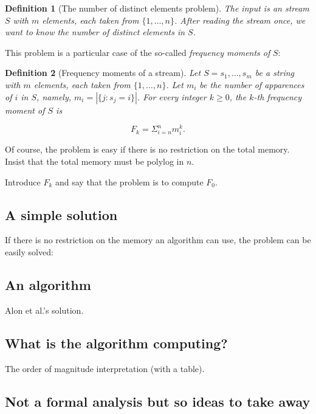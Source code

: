 \documentclass[12pt]{article}
\newtheorem{definition}{Definition}
\begin{document}
\begin{definition}[The number of distinct elements problem]
The input is an stream $S$ with $m$ elements, each taken from $\{1, \hdots, n\}$.
After reading the stream once, we want to know the number of distinct elements in $S$.
\end{definition}

This problem is a particular case of the so-called \emph{frequency moments of} $S$:


\begin{definition}[Frequency moments of a stream]
Let $S = s_1, \hdots, s_m$ be a string with $m$ elements, each taken from $\{1, \hdots, n\}$.
Let $m_i$ be the number of apparences of $i$ in $S$, namely, $m_i = | \{j : s_j = i\} |$.
For every integer $k \geq 0$, the \emph{$k$-th frequency moment of $S$} is

$$F_k = \Sigma^n_{i = n} m_i^k.$$ 
\end{definition}






Of course, the problem is easy if there is no restriction on the total memory.
Insist that the total memory must be polylog in $n$.

Introduce $F_k$ and say that the problem is to compute $F_0$.



\subsection{A simple solution}
If there is no restriction on the memory an algorithm can use, the problem can be easily solved:






\subsection{An algorithm}

Alon et al.'s solution.

\subsection{What is the algorithm computing?}

The order of magnitude interpretation (with a table).


\subsection{Not a formal analysis but so ideas to take away}
\end{document}
